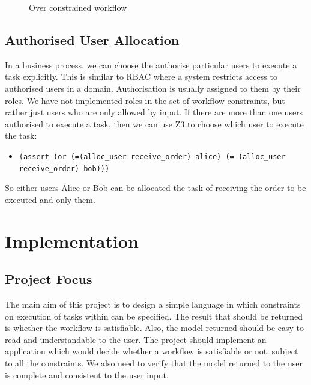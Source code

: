\documentclass[a4paper]{report}
\begin{document}
\begin{figure}[!h]
\centering
{}
\caption{Over constrained workflow}
\label{fig:Over constrained workflow}
\end{figure}

\section{Authorised User Allocation}
In a business process, we can choose the authorise particular users to execute a task explicitly. This is similar to RBAC\cite{rbac} where a system restricts access to authorised users in a domain. Authorisation is usually assigned to them by their roles. We have not implemented roles in the set of workflow constraints, but rather just users who are only allowed by input. If there are more than one users authorised to execute a task, then we can use Z3 to choose which user to execute the task:
\begin{itemize}
\item \texttt{(assert (or (=(alloc\_user receive\_order) alice) (= (alloc\_user receive\_order) bob)))
}
\end{itemize}
So either users Alice or Bob can be allocated the task of receiving the order to be executed and only them.

\chapter{Implementation}
\section{Project Focus}
The main aim of this project is to design a simple language in which constraints on execution of tasks within can be specified. The result that should be returned is whether the workflow is satisfiable. Also, the model returned should be easy to read and understandable to the user. The project should implement an application which would decide whether a workflow is satisfiable or not, subject to all the constraints. We also need to verify that the model returned to the user is complete and consistent to the user input.\\
\end{document}
